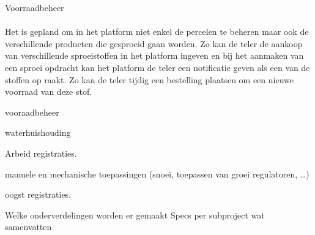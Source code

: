 Voorraadbeheer

\paragraph {} Het is gepland om in het platform niet enkel de percelen te beheren maar ook de
verschillende producten die gesproeid gaan worden. Zo kan de teler de aankoop van
verschillende sproeistoffen in het platform ingeven en bij het aanmaken van een sproei
opdracht kan het platform de teler een notificatie geven als een van de stoffen op raakt.
Zo kan de teler tijdig een bestelling plaatsen om een nieuwe voorraad van deze stof.

vooraadbeheer

waterhuishouding

Arbeid registraties.

manuele en mechanische toepassingen (snoei,  toepassen van groei regulatoren, …)

oogst registraties.


Welke onderverdelingen worden er gemaakt
Specs per subproject wat samenvatten


